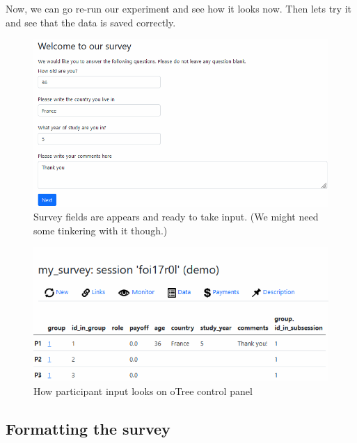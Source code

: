 \documentclass[
  letterpaper,
  DIV=11,
  numbers=noendperiod]{scrreprt}
\begin{document}
Now, we can go re-run our experiment and see how it looks now. Then lets
try it and see that the data is saved correctly.

\begin{figure}

{\centering \includegraphics{part_otree/survey_datacorrect1.png}

}

\caption{\label{fig-survey-datacorrect1}Survey fields are appears and
ready to take input. (We might need some tinkering with it though.)}

\end{figure}

\begin{figure}

{\centering \includegraphics{part_otree/survey_datacorrect2.png}

}

\caption{\label{fig-survey-datacorrect2}How participant input looks on
oTree control panel}

\end{figure}

\hypertarget{formatting-the-survey}{%
\subsection{Formatting the survey}\label{formatting-the-survey}}
\end{document}
